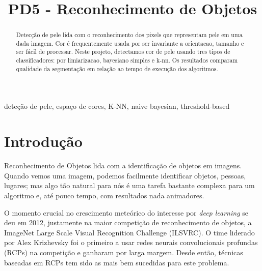 \documentclass[conference]{IEEEtran}
\begin{document}
\title{PD5 - Reconhecimento de Objetos}

\author{
}

\maketitle

\begin{abstract}
Detecção de pele lida com o reconhecimento dos
pixels que representam pele em uma dada imagem. Cor é frequentemente usada por ser invariante a orientacao, tamanho e ser
fácil de processar. Neste projeto, detectamos cor de pele usando
tres tipos de classificadores: por limiarizacao, bayesiano simples
e k-nn. Os resultados comparam qualidade da segmentação em
relação ao tempo de execução dos algoritmos. 
\end{abstract}

\begin{IEEEkeywords}
deteção de pele, espaço de cores, K-NN, naive bayesian, threshold-based
\end{IEEEkeywords}

\section{Introdução}

Reconhecimento de Objetos lida com a identificação de objetos em imagens. Quando vemos uma imagem, podemos facilmente identificar objetos, pessoas, lugares; mas algo tão natural para nós é uma tarefa bastante complexa para um algoritmo e, até pouco tempo, com resultados nada animadores.

O momento crucial no crescimento meteórico do interesse por \textit{deep learning} se deu em 2012, justamente na maior competição de reconhecimento de objetos, a  ImageNet Large Scale Visual Recognition Challenge  (ILSVRC)\cite{goodfellow}. O time liderado por Alex Krizhevsky foi o primeiro a usar redes neurais convolucionais profundas (RCPs) na competição e ganharam por larga margem\cite{alexnet}. Desde então, técnicas baseadas em RCPs tem sido as mais bem sucedidas para este problema.
\end{document}
